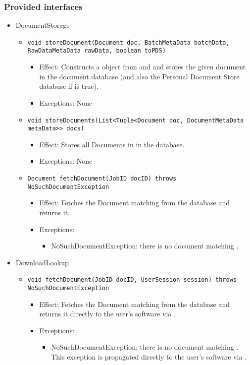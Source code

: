 \subsubsection*{Provided interfaces}
\begin{itemize}
	\item DocumentStorage
	\begin{itemize}
		\item \texttt{void storeDocument(Document doc, BatchMetaData batchData, RawDataMetaData rawData, boolean toPDS)}
		\begin{itemize}
			\item Effect: Constructs a  object from  and  and stores the given document in the document database (and also the Personal Document Store database if  is true).
			\item Exceptions: None
		\end{itemize}

		\item \texttt{void storeDocuments(List<Tuple<Document doc, DocumentMetaData metaData>> docs)}
		\begin{itemize}
			\item Effect: Stores all Documents in  in the database.
			\item Exceptions: None
		\end{itemize}
		
		\item \texttt{Document fetchDocument(JobID docID) throws NoSuchDocumentException}
		\begin{itemize}
			\item Effect: Fetches the Document matching  from the database and returns it.
			\item Exceptions: 
			\begin{itemize}
				\item NoSuchDocumentException: there is no document matching .
			\end{itemize}
		\end{itemize}
	\end{itemize}
	
	\item DownloadLookup
	\begin{itemize}
		\item \texttt{void fetchDocument(JobID docID, UserSession session) throws NoSuchDocumentException}
		\begin{itemize}
			\item Effect: Fetches the Document matching  from the database and returns it directly to the user's software via .
			\item Exceptions:
			\begin{itemize}
				\item NoSuchDocumentException: there is no document matching . This exception is propagated directly to the user's software via .
			\end{itemize}
		\end{itemize}
	\end{itemize}
	

\end{itemize}
